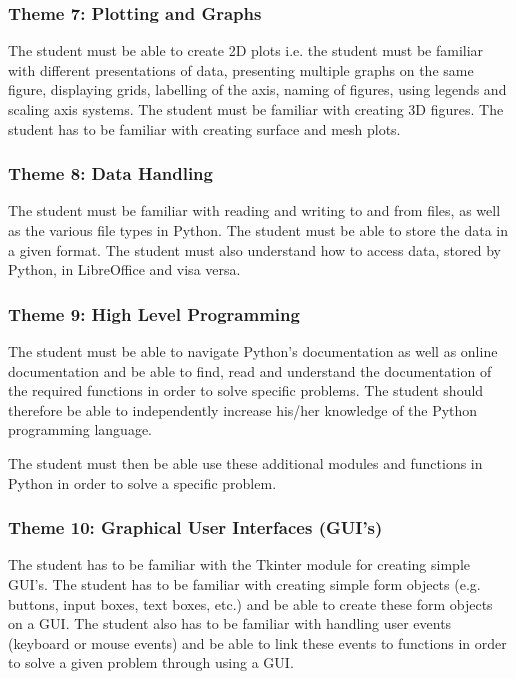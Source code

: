         \subsubsection{Theme 7: Plotting and Graphs}
            The student must be able to create 2D plots i.e. the student must
            be familiar with different presentations of data, presenting
            multiple graphs on the same figure, displaying grids, labelling of
            the axis, naming of figures, using legends and scaling axis
            systems. The student must be familiar with creating 3D figures.
            The student has to be familiar with creating surface and mesh plots.

        \subsubsection{Theme 8: Data Handling}
            The student must be familiar with reading and writing to and from
            files, as well as the various file types in Python. The student
            must be able to store the data in a given format. The student must
            also understand how to access data, stored by Python, in
            LibreOffice and visa versa.

        \subsubsection{Theme 9: High Level Programming}
                The student must be able to navigate Python's documentation
                as well as online documentation and be able to find, read and
                understand the documentation of the required functions in order
                to solve specific problems. The student should therefore be
                able to independently increase his/her knowledge of the Python
                programming language.

                The student must then be able use these additional modules and
                functions in Python in order to solve a specific problem.

        \subsubsection{Theme 10: Graphical User Interfaces (GUI's)}
            The student has to be familiar with the Tkinter module for creating
            simple GUI's. The student has to be familiar with creating simple
            form objects (e.g. buttons, input boxes, text boxes, etc.) and be
            able to create these form objects on a GUI. The student also has to
            be familiar with handling user events (keyboard or mouse events)
            and be able to link these events to functions in order to solve
            a given problem through using a GUI.

